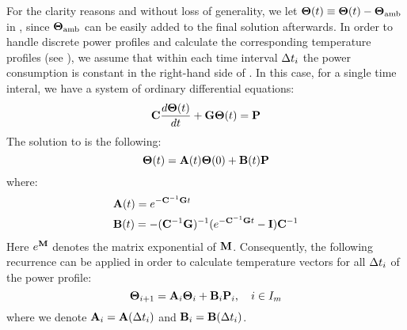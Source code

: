 For the clarity reasons and without loss of generality, we let $\mathbf{\Theta}(t) \equiv \mathbf{\Theta}(t) - \mathbf{\Theta}_{\text{amb}}$ in , since $\mathbf{\Theta}_{\text{amb}}$ can be easily added to the final solution afterwards. In order to handle discrete power profiles and calculate the corresponding temperature profiles (see ), we assume that within each time interval $\Delta t_i$ the power consumption is constant in the right-hand side of . In this case, for a single time interal, we have a system of ordinary differential equations:
\begin{equation} \equlabel{fourier-constant-power}
  \mcapacitance \frac{d\vtemp(\time)}{d\time} + \mconductance \vtemp(\time) = \vpower
\end{equation}
The solution to  is the following:
\[
  \mathbf{\Theta}(t) = \mathbf{A}(t) \mathbf{\Theta}(0) + \mathbf{B}(t) \mathbf{P}
\]
where:
\begin{align}
  & \m{A}(\time) = \emcg{\time} \equlabel{a} \\
  & \m{B}(\time) = -(\cg)^{-1}(\emcg{\time} - \mone) \mcapacitance^{-1} \equlabel{b}
\end{align}
Here $e^{\mathbf{M}}$ denotes the matrix exponential of $\mathbf{M}$. Consequently, the following recurrence can be applied in order to calculate temperature vectors for all $\Delta t_i$ of the power profile:
\begin{equation} \equlabel{fourier-recurrence}
  \vtemp_{i + 1} = \m{A}_i \vtemp_i + \m{B}_i \vpower_i, \sep i \in \timeindex
\end{equation}
where we denote $\mathbf{A}_i = \mathbf{A}(\Delta t_i)$ and $\mathbf{B}_i = \mathbf{B}(\Delta t_i)$.
